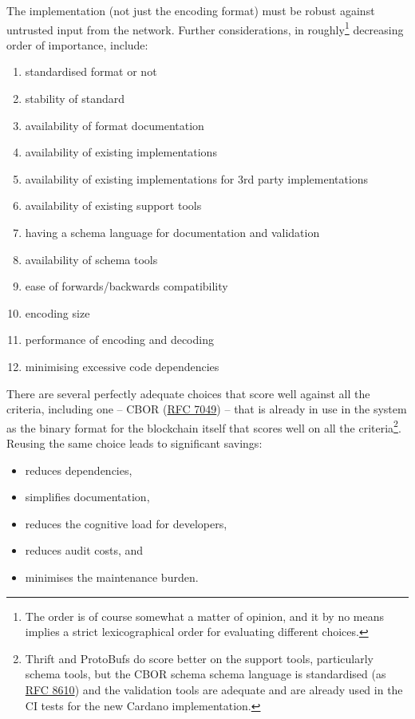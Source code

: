 \documentclass[11pt,a4paper]{article}
\begin{document}
The implementation (not just the encoding format) must be robust against
untrusted input from the network. Further considerations, in
roughly\footnote{The order is of course somewhat a matter of opinion,
  and it by no means implies a strict lexicographical order for
  evaluating different choices.} decreasing order of importance,
include:

\begin{enumerate}
\item
  standardised format or not
\item
  stability of standard
\item
  availability of format documentation
\item
  availability of existing implementations
\item
  availability of existing implementations for 3rd party implementations
\item
  availability of existing support tools
\item
  having a schema language for documentation and validation
\item
  availability of schema tools
\item
  ease of forwards/backwards compatibility
\item
  encoding size
\item
  performance of encoding and decoding
\item
  minimising excessive code dependencies
\end{enumerate}

There are several perfectly adequate choices that score well against all
the criteria, including one -- CBOR
(\href{https://tools.ietf.org/html/rfc7049}{{RFC 7049}}) -- that is
already in use in the system as the binary format for the blockchain
itself that scores well on all the criteria\footnote{Thrift and
  ProtoBufs do score better on the support tools, particularly schema
  tools, but the CBOR schema schema language is standardised (as
  \href{https://tools.ietf.org/html/rfc8610}{{RFC 8610}}) and the
  validation tools are adequate and are already used in the CI tests for
  the new Cardano implementation.}. Reusing the same choice leads to
significant savings:

\begin{itemize}
\item
  reduces dependencies,
\item
  simplifies documentation,
\item
  reduces the cognitive load for developers,
\item
  reduces audit costs, and
\item
  minimises the maintenance burden.
\end{itemize}
\end{document}
